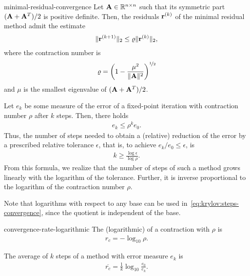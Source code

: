 \begin{Theorem}{minimal-residual-convergence}
  Let $\mathbf A\in\mathbb R^{n\times n}$ such that its symmetric part $(\mathbf A+\mathbf A^T)/2$
  is positive definite. Then, the residuals $\mathbf r^{(k)}$ of the minimal
  residual method admit the estimate
  \begin{gather}
    \lVert\mathbf r^{(k+1)}\rVert_2 \le \varrho \lVert\mathbf r^{(k)}\rVert_2,
  \end{gather}
  where the contraction number is
  \begin{gather}
    \varrho = \left(1-\frac{\mu^2}{\lVert\mathbf A\rVert^2}\right)^{\nicefrac12}
  \end{gather}
  and $\mu$ is the smallest eigenvalue of $(\mathbf A+\mathbf A^T)/2$.
\end{Theorem}

\begin{remark}
  Let $e_k$ be some measure of the error of a fixed-point iteration
  with contraction number $\rho$ after $k$ steps. Then, there holds
  \begin{gather}
    e_k \le \rho^k e_0.
  \end{gather}
  Thus, the number of steps needed to obtain a (relative) reduction of
  the error by a prescribed relative tolerance $\epsilon$, that is, to
  achieve $e_k/e_0\le\epsilon$, is
  \begin{gather}
    \label{eq:krylov:steps-convergence}
    k \ge \frac{\log\epsilon}{\log\rho}.
  \end{gather}
  From this formula, we realize that the number of steps of such a
  method grows linearly with the logarithm of the tolerance. Further,
  it is inverse proportional to the logarithm of the contraction
  number $\rho$.

  Note that logarithms with respect to any base can be used
  in~\eqref{eq:krylov:steps-convergence}, since the quotient is
  independent of the base.
\end{remark}

\begin{Definition}{convergence-rate-logarithmic}
  The (logarithmic)  of a contraction with
   $\rho$ is
  \begin{gather}
    r_c = -\log_{10} \rho.
  \end{gather}

  The average  of $k$ steps of a
  method with error measure $e_k$ is
  \begin{gather}
    \overline{r_c} = \frac1k \log_{10}\frac{e_0}{e_k}.
  \end{gather}
\end{Definition}

